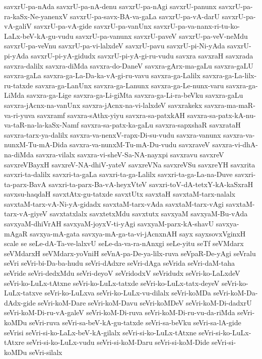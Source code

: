 {savxrU-pa-nAda
savxrU-pa-nA-denu
savxrU-pa-nAgi
savxrU-panunx
savxrU-pa-ra-kaSx-Ne-yanenxV
savxrU-pa-savx-BA-va-gaLa
savxrU-pa-vA-darU
savxrU-pa-vA-galiV
savxrU-pa-vA-gide
savxrU-pa-vanUnx
savxrU-pa-va-nanx-ri-tu-ko-LaLx-beV-kA-gu-vudu
savxrU-pa-vanunx
savxrU-paveV
savxrU-pa-veV-neMdu
savxrU-pa-veVnu
savxrU-pa-vi-lalxdeV
savxrU-pavu
savxrU-pi-Ni-yAda
savxrU-pi-yAda
savxrU-pi-yA-gidudx
savxrU-pi-yA-gi-ru-vudu
savxra
savxraH
savxrada
savxra-dalilx
savxra-diMda
savxra-do-DaneV
savxra-gArx-ma-gaLu
savxra-gaLU
savxra-gaLa
savxra-ga-La-Da-ka-vA-gi-ru-vavu
savxra-ga-Lalilx
savxra-ga-La-lilx-ru-tatxde
savxra-ga-LanUnx
savxra-ga-Lanunx
savxra-ga-Le-nunx-varu
savxra-ga-LiMda
savxra-ga-Lige
savxra-ga-Li-giMta
savxra-ga-Li-ra-beVku
savxra-gaLu
savxra-jAcnx-na-vanUnx
savxra-jAcnx-na-vi-lalxdeV
savxrakekx
savxra-ma-maR-va-ri-yuva
savxramf
savxra-sAthx-yiyu
savxra-sa-patxkAH
savxra-sa-patx-kA-nu-va-taR-na-la-kaSx-Namf
savxra-sa-patx-ka-gaLu
savxra-sapxshaR
savxrataH
savxra-tarx-ya-dalilx
savxra-va-nenxV-rapx-Di-su-vudu
savxra-vanunx
savxra-va-nunxM-Tu-mA-Dida
savxra-va-nunxM-Tu-mA-Du-vudu
savxraveV
savxra-vi-dhA-na-diMda
savxra-vilalx
savxra-vi-sheV-Sa-NA-nayxpi
savxravu
savxreV
savxreVBayxH
savxreV-NA-dhiV-yateV
savxreVNa
savxreVSu
savxreYH
savxrita
savxri-ta-dalilx
savxri-ta-gaLa
savxri-ta-ga-Lalilx
savxri-ta-ga-La-na-Duve
savxri-ta-parx-BavA
savxri-ta-parx-Ba-vA-heyxVteV
savxri-toV-dA-tetxY-kA-kaSxraH
savxsu-haqdaH
savxtAtx-gu-tatxde
savxtUtx
savxtaH
savxtaM-tarx-nalalx
savxtaM-tarx-vA-Ni-yA-gidadx
savxtaM-tarx-vAda
savxtaM-tarx-vAgi
savxtaM-tarx-vA-giyeV
savxtatxlalx
savxtetxMdu
savxtutx
savxyaM
savxyaM-Bu-vAda
savxyaM-dhiVrAH
savxyaM-joyxV-ti-yAgi
savxyaM-parx-kA-shavU
savxya-mAgaR
savxya-mA-gata
savxya-mA-ga-ta-vi-jAcnxnAH
sayx
sayxsovxVginxH
scale
se
seLe-dA-Ta-ve-lalxvU
seLe-da-va-ra-nAnxgi
seLe-yitu
seTf
seVMdarx
seVMdarxH
seVMdarx-yoVniH
seVnA-pa-De-ya-lilx-ruva
seVpaR-De-yAgi
seVralu
seVri
seVri-bi-Da-ba-hudu
seVri-dAdxre
seVri-dAga
seVrida
seVri-daM-taha
seVride
seVri-dedxMdu
seVri-deyoV
seVridodxV
seVridudx
seVri-ko-LaLxdeV
seVri-ko-LuLx-tAtxne
seVri-ko-LuLx-tatxde
seVri-ko-LuLx-tatx-deyeV
seVri-ko-LuLx-tatxve
seVri-ko-LuLxva
seVri-ko-LuLx-vu-dilalx
seVri-koMDa
seVri-koM-Da-dAdx-gide
seVri-koM-Dare
seVri-koM-Davu
seVri-koMDeV
seVri-koM-Di-dadxrU
seVri-koM-Di-ru-vA-galeV
seVri-koM-Di-ruva
seVri-koM-Di-ru-vu-da-riMda
seVri-koMDu
seVri-ruva
seVri-sa-beV-kA-gu-tatxde
seVri-sa-beVku
seVri-sa-lA-gide
seVrisi
seVri-si-ko-LaLx-beV-kA-gilalx
seVri-si-ko-LuLx-tAtxne
seVri-si-ko-LuLx-tAtxre
seVri-si-ko-LuLx-vudu
seVri-si-koM-Daru
seVri-si-koM-Dide
seVri-si-koMDu
seVri-silalx
}
